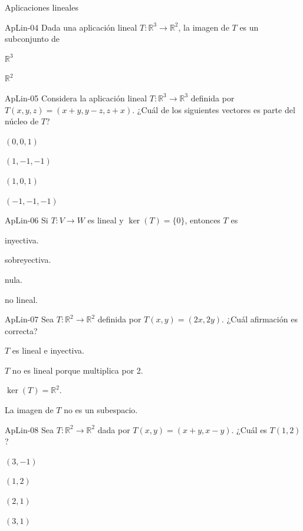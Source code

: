 \documentclass[a4,11pt]{aleph-notas}
\begin{document}
\begin{quiz}{Aplicaciones lineales}
\begin{multi}[]%
    {ApLin-04}
    Dada una aplicación lineal \( T: \mathbb{R}^3 \rightarrow \mathbb{R}^2 \), la imagen de $T$ es un subconjunto de
    \item $\mathbb{R}^3$
    \item* $\mathbb{R}^2$
\end{multi}

\begin{multi}[]%
    {ApLin-05}
    Considera la aplicación lineal \( T: \mathbb{R}^3 \rightarrow \mathbb{R}^3 \) definida por \( T(x, y, z) = (x + y, y-z, z+x) \). ¿Cuál de los siguientes vectores es parte del núcleo de \( T \)?
    \item $(0, 0, 1)$
    \item* $(1, -1, -1)$
    \item $(1, 0, 1)$
    \item $(-1, -1, -1)$
\end{multi}

\begin{multi}[]%
    {ApLin-06}
    Si \(T:V\rightarrow W\) es lineal y \(\ker(T)=\{0\}\), entonces \(T\) es
    \item* inyectiva.
    \item sobreyectiva.
    \item nula.
    \item no lineal.
\end{multi}

\begin{multi}[]%
    {ApLin-07}
    Sea \(T:\mathbb{R}^2\rightarrow\mathbb{R}^2\) definida por \(T(x,y)=(2x,2y)\). ¿Cuál afirmación es correcta?
    \item* \(T\) es lineal e inyectiva.
    \item \(T\) no es lineal porque multiplica por 2.
    \item \(\ker(T)=\mathbb{R}^2\).
    \item La imagen de \(T\) no es un subespacio.
\end{multi}

\begin{multi}[]%
    {ApLin-08}
    Sea \(T:\mathbb{R}^2\to\mathbb{R}^2\) dada por \(T(x,y)=(x+y,x-y)\). ¿Cuál es \(T(1,2)\)?
    \item* \((3,-1)\)
    \item \((1,2)\)
    \item \((2,1)\)
    \item \((3,1)\)
\end{multi}


\end{quiz}
\end{document}
